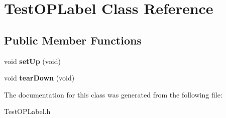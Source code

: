 \hypertarget{classTestOPLabel}{
\section{TestOPLabel Class Reference}
\label{classTestOPLabel}
}
\subsection*{Public Member Functions}
\begin{DoxyCompactItemize}
\item 
\hypertarget{classTestOPLabel_a9ddb0e7ab19700d5bf73490ba0ebbf36}{
void {\bfseries setUp} (void)}
\label{classTestOPLabel_a9ddb0e7ab19700d5bf73490ba0ebbf36}

\item 
\hypertarget{classTestOPLabel_a6bc3fb561309973920fe3abc020facf1}{
void {\bfseries tearDown} (void)}
\label{classTestOPLabel_a6bc3fb561309973920fe3abc020facf1}

\end{DoxyCompactItemize}


The documentation for this class was generated from the following file:\begin{DoxyCompactItemize}
\item 
TestOPLabel.h\end{DoxyCompactItemize}
